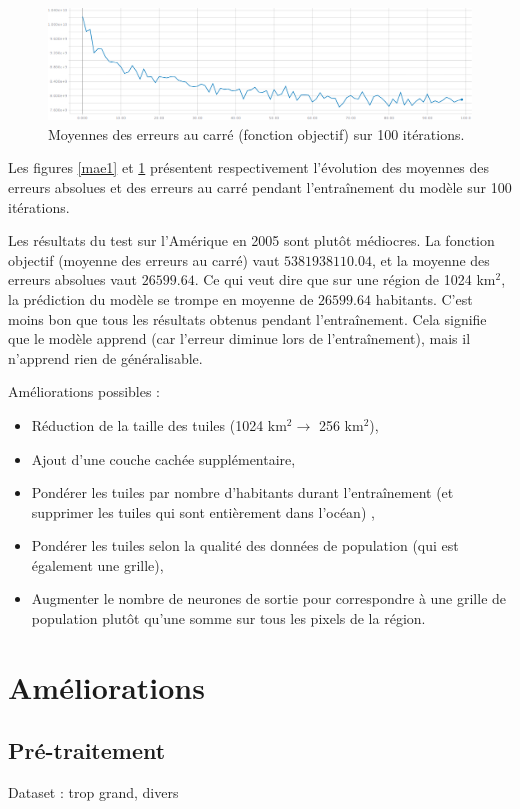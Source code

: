 \documentclass[a4paper, 11pt]{report}
\begin{document}
\begin{figure}
	\centering
	\includegraphics[width=1.0\textwidth]{img/mse1.png}
	\caption{Moyennes des erreurs au carré (fonction objectif) sur 100 itérations.}
	\label{mse1}
\end{figure}

Les figures \ref{mae1} et \ref{mse1} présentent respectivement l'évolution des moyennes des erreurs absolues et des erreurs au carré pendant l'entraînement du modèle sur 100 itérations.

Les résultats du test sur l'Amérique en 2005 sont plutôt médiocres. La fonction objectif (moyenne des erreurs au carré) vaut $5381938110.04$, et la moyenne des erreurs absolues vaut $26599.64$. Ce qui veut dire que sur une région de 1024 km$^2$, la prédiction du modèle se trompe en moyenne de $26599.64$ habitants. C'est moins bon que tous les résultats obtenus pendant l'entraînement. Cela signifie que le modèle apprend (car l'erreur diminue lors de l'entraînement), mais il n'apprend rien de généralisable.

Améliorations possibles :
\begin{itemize}
	\item Réduction de la taille des tuiles (1024 km$^2 \rightarrow$ 256 km$^2$),
	\item Ajout d'une couche cachée supplémentaire,
	\item Pondérer les tuiles par nombre d'habitants durant l'entraînement (et supprimer les tuiles qui sont entièrement dans l'océan) \cite{netpop-article},
	\item Pondérer les tuiles selon la qualité des données de population (qui est également une grille),
	\item Augmenter le nombre de neurones de sortie pour correspondre à une grille de population plutôt qu'une somme sur tous les pixels de la région.
\end{itemize}

\section{Améliorations}
\subsection{Pré-traitement}
Dataset : trop grand, divers
\end{document}

